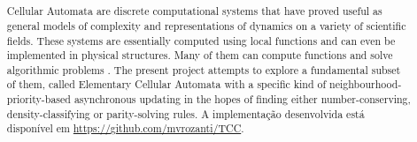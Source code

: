 \documentclass[a4paper,12pt]{ltxdoc}
\title{\protect\parbox{\textwidth}{\protect\centering \textbf{\titulo}}}
\date{}
\begin{document}
\def\instnum{}
\newcommand{\titulo}{
  \large{\centerline{Três Experimentos com Atualização Assíncrona por Prioridade}}
  \large{\centerline{de Vizinhança em Autômatos Celulares Elementares}}
  \\~\\
  \normalfont{\normalsize{Marcelo Vironda Rozanti\\Felipe Stefanelli de Aguiar Silva\\Prof. Dr. Pedro Paulo Balbi de Oliveira\\Faculdade de Computação e Informática - Universidade Presbiteriana Mackenzie \\São Paulo, SP -- Brasil}}\\
}

\maketitle

\begin{abstract}
  Cellular Automata are discrete computational systems that have proved useful as general models of complexity and representations of dynamics on a variety of scientific fields. These systems are essentially computed using local functions and can even be implemented in physical structures. Many of them can compute functions and solve algorithmic problems . The present project attempts to explore a fundamental subset of them, called Elementary Cellular Automata with a specific kind of neighbourhood-priority-based asynchronous updating in the hopes of finding either number-conserving, density-classifying or parity-solving rules.
  A implementação desenvolvida está disponível em \url{https://github.com/mvrozanti/TCC}.
\end{abstract}
\end{document}
